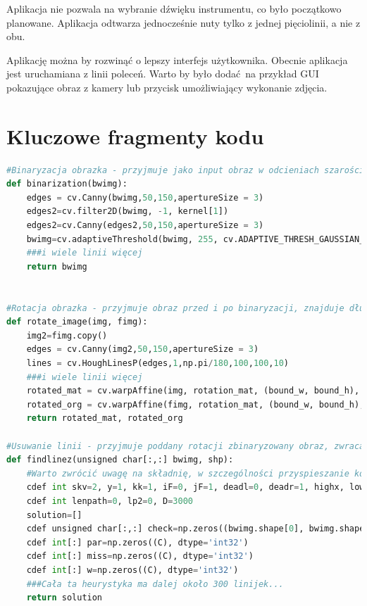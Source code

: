 \documentclass[12pt]{article}
\begin{document}
Aplikacja nie pozwala na wybranie dźwięku instrumentu, co było początkowo planowane. Aplikacja odtwarza jednocześnie nuty tylko z jednej pięciolinii, a nie z obu.

Aplikację można by rozwinąć o lepszy interfejs użytkownika. Obecnie aplikacja jest uruchamiana z linii poleceń. Warto by było dodać na przykład GUI pokazujące obraz z kamery lub przycisk umożliwiający wykonanie zdjęcia.

\clearpage
\section{Kluczowe fragmenty kodu}
\begin{lstlisting}[language=Python]
#Binaryzacja obrazka - przyjmuje jako input obraz w odcieniach szarości, zwraca obraz czarno biały z uwypuklonymi ciemniejszymi niż tło obszarami. Opiera się na kompletnym zaciemnieniu obszarów, wokół których kolor nigdy się nie zmienia i standardowej binaryzacji dla pozostałych obszarów obrazka
def binarization(bwimg):
	edges = cv.Canny(bwimg,50,150,apertureSize = 3)
	edges2=cv.filter2D(bwimg, -1, kernel[1])
	edges2=cv.Canny(edges2,50,150,apertureSize = 3)
	bwimg=cv.adaptiveThreshold(bwimg, 255, cv.ADAPTIVE_THRESH_GAUSSIAN_C, cv.THRESH_BINARY, Hypers['Binarization_conn'], 1)
	###i wiele linii więcej
	return bwimg
	

#Rotacja obrazka - przyjmuje obraz przed i po binaryzacji, znajduje długie linie na oryginalnym obrazku po czym dzeli je na klasy abstrakcji tak, że linie x, y są w 1 klasie abstrakcji, jeśli istnieje takie z, że z*0.01<=cos(x),cos(y)<z*0.01+0.01. W zależności od klasy abstrakcji o największej mocy zbioru ustawiam obrazek tak, aby jak najwięcej linii było poziomych. Zwraca Obrócone obrazy - oryginalny i zbinaryzowany
def rotate_image(img, fimg):
	img2=fimg.copy()
	edges = cv.Canny(img2,50,150,apertureSize = 3)
	lines = cv.HoughLinesP(edges,1,np.pi/180,100,100,10)
	###i wiele linii więcej
	rotated_mat = cv.warpAffine(img, rotation_mat, (bound_w, bound_h), borderValue=255)
	rotated_org = cv.warpAffine(fimg, rotation_mat, (bound_w, bound_h), borderValue=255)
	return rotated_mat, rotated_org
	
#Usuwanie linii - przyjmuje poddany rotacji zbinaryzowany obraz, zwraca zbinaryzowany obraz pozbawiony linii przez referencję, a także miejsca występowania pięciolinii. Kod opiera się na kilkudziesięciu heurystykach grafowych (obrazek jest traktowany jako graf, który można przejść algorytmem Breadth First Search zatrzymując algrytm po znalezieniu wszystkich linii poziomych). Algorytm celem skrócenia czasu jego wykonania został przeniesiony do Cythona
def findlinez(unsigned char[:,:] bwimg, shp):
	#Warto zwrócić uwagę na składnię, w szczególności przyspieszanie kodu za pomocą memoryviewa
	cdef int skv=2, y=1, kk=1, iF=0, jF=1, deadl=0, deadr=1, highx, lowx, x1, x2, C=140000, myconst=Hyperparameters['Upgrade']
	cdef int lenpath=0, lp2=0, D=3000
	solution=[]
	cdef unsigned char[:,:] check=np.zeros((bwimg.shape[0], bwimg.shape[1]), dtype='uint8')
	cdef int[:] par=np.zeros((C), dtype='int32')
	cdef int[:] miss=np.zeros((C), dtype='int32')
	cdef int[:] w=np.zeros((C), dtype='int32')
	###Cała ta heurystyka ma dalej około 300 linijek...
	return solution
	

\end{lstlisting}
\end{document}
